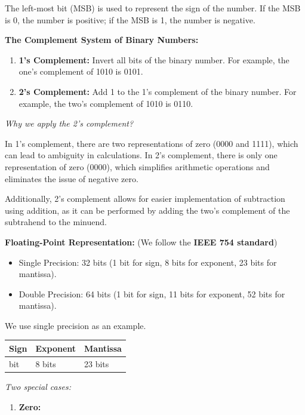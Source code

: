 \documentclass[
  a4paper,
]{article}
\providecommand{\tightlist}{%
  \setlength{\itemsep}{0pt}\setlength{\parskip}{0pt}}
\begin{document}
The left-most bit (MSB) is used to represent the sign of the number. If
the MSB is 0, the number is positive; if the MSB is 1, the number is
negative.

\textbf{The Complement System of Binary Numbers:}\\

\begin{enumerate}
\def\labelenumi{\arabic{enumi}.}
\tightlist
\item
  \textbf{1's Complement:} Invert all bits of the binary number. For
  example, the one's complement of 1010 is 0101.
\item
  \textbf{2's Complement:} Add 1 to the 1's complement of the binary
  number. For example, the two's complement of 1010 is 0110.
\end{enumerate}

\emph{Why we apply the 2's complement?}

In 1's complement, there are two representations of zero (0000 and
1111), which can lead to ambiguity in calculations. In 2's complement,
there is only one representation of zero (0000), which simplifies
arithmetic operations and eliminates the issue of negative zero.

Additionally, 2's complement allows for easier implementation of
subtraction using addition, as it can be performed by adding the two's
complement of the subtrahend to the minuend.

\textbf{Floating-Point Representation:} (We follow the \textbf{IEEE 754
standard})

\begin{itemize}
\tightlist
\item
  Single Precision: 32 bits (1 bit for sign, 8 bits for exponent, 23
  bits for mantissa).
\item
  Double Precision: 64 bits (1 bit for sign, 11 bits for exponent, 52
  bits for mantissa).
\end{itemize}

We use single precision as an example.

\begin{longtable}[]{@{}lll@{}}
\toprule\noalign{}
Sign & Exponent & Mantissa \\
\midrule\noalign{}
\endhead
\bottomrule\noalign{}
\endlastfoot
1 bit & 8 bits & 23 bits \\
\end{longtable}

\emph{Two special cases:}

\begin{enumerate}
\def\labelenumi{\arabic{enumi}.}
\tightlist
\item
  \textbf{Zero:}
\end{enumerate}
\end{document}

